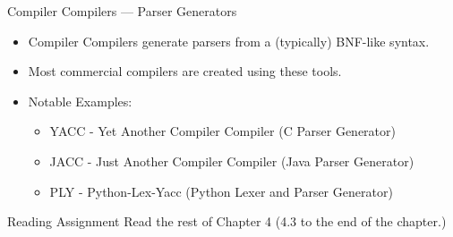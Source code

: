 \documentclass[handout]{beamer}
\newenvironment{code}{%
 \VerbatimEnvironment
 \begin{adjustbox}{max width=\textwidth, max height=0.7\textheight}
 \begin{BVerbatim}
  }{
  \end{BVerbatim}
 \end{adjustbox}
}
\begin{document}
\begin{frame}{Compiler Compilers --- Parser Generators}
    \begin{itemize}
        \item Compiler Compilers generate parsers from a (typically) BNF-like syntax.
        \item Most commercial compilers are created using these tools.
        \item Notable Examples:
        \begin{itemize}
            \item YACC - Yet Another Compiler Compiler (C Parser Generator)
            \item JACC - Just Another Compiler Compiler (Java Parser Generator)
            \item PLY - Python-Lex-Yacc (Python Lexer and Parser Generator)
        \end{itemize}
    \end{itemize}
\end{frame}



\begin{frame}{Reading Assignment}
    Read the rest of Chapter 4 (4.3 to the end of the chapter.)
\end{frame}
\end{document}
